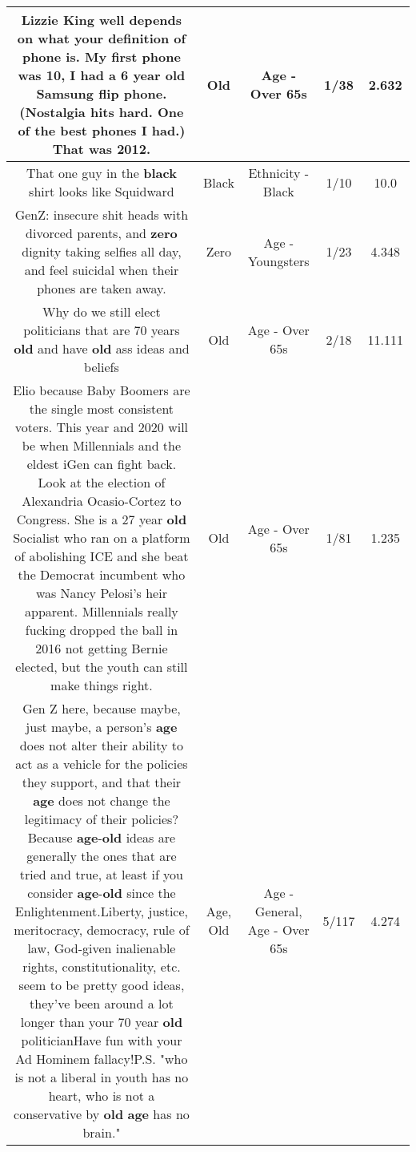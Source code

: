 \documentclass[11pt]{article}
\newlength\mylength
\begin{document}
\begin{center}
\begin{longtable}{|C{.65\mylength}|C{.30\mylength}|C{.12\mylength}|C{.12\mylength}|C{.12\mylength}|}
  \small Lizzie King well depends on what your definition of phone is. My first phone was 10, I had a 6 year \textbf{old} Samsung flip phone. (Nostalgia hits hard. One of the best phones I had.) That was 2012.\normalsize   & Old & Age - Over 65s & 1/38 & 2.632 \\  \hline
  \small That one guy in the \textbf{black} shirt looks like Squidward\normalsize   & Black & Ethnicity - Black & 1/10 & 10.0 \\  \hline
  \small GenZ: insecure shit heads with divorced parents, and \textbf{zero} dignity taking selfies all day, and feel suicidal when their phones are taken away.\normalsize   & Zero & Age - Youngsters & 1/23 & 4.348 \\  \hline
  \small Why do we still elect politicians that are 70 years \textbf{old} and have \textbf{old} ass ideas and beliefs\normalsize   & Old & Age - Over 65s & 2/18 & 11.111 \\  \hline
  \small Elio because Baby Boomers are the single most consistent voters. This year and 2020 will be when Millennials and the eldest iGen can fight back. Look at the election of Alexandria Ocasio-Cortez to Congress. She is a 27 year \textbf{old} Socialist who ran on a platform of abolishing ICE and she beat the Democrat incumbent who was Nancy Pelosi's heir apparent. Millennials really fucking dropped the ball in 2016 not getting Bernie elected, but the youth can still make things right.\normalsize   & Old & Age - Over 65s & 1/81 & 1.235 \\  \hline
  \small Gen Z here, because maybe, just maybe, a person's \textbf{age} does not alter their ability to act as a vehicle for the policies they support, and that their \textbf{age} does not change the legitimacy of their policies?Because \textbf{age}-\textbf{old} ideas are generally the ones that are tried and true, at least if you consider \textbf{age}-\textbf{old} since the Enlightenment.Liberty, justice, meritocracy, democracy, rule of law, God-given inalienable rights, constitutionality, etc. seem to be pretty good ideas, they've been around a lot longer than your 70 year \textbf{old} politicianHave fun with your Ad Hominem fallacy!P.S. "who is not a liberal in youth has no heart, who is not a conservative by \textbf{old} \textbf{age} has no brain."\normalsize   & Age, Old & Age - General, Age - Over 65s & 5/117 & 4.274 \\  \hline

\end{longtable}
\end{center}
\end{document}
